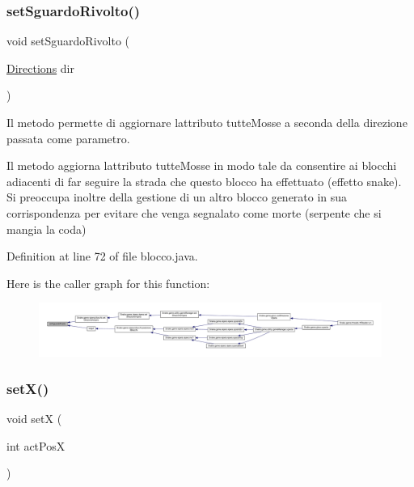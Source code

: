 \subsubsection{\texorpdfstring{set\+Sguardo\+Rivolto()}{setSguardoRivolto()}}
{\footnotesize\ttfamily void set\+Sguardo\+Rivolto (\begin{DoxyParamCaption}\item[{\mbox{\hyperlink{enum_snake_1_1game_1_1utility_1_1_directions}{Directions}}}]{dir }\end{DoxyParamCaption})}



Il metodo permette di aggiornare l\textquotesingle{}attributo tutte\+Mosse a seconda della direzione passata come parametro. 

Il metodo aggiorna l\textquotesingle{}attributo tutte\+Mosse in modo tale da consentire ai blocchi adiacenti di far seguire la strada che questo blocco ha effettuato (effetto snake). Si preoccupa inoltre della gestione di un altro blocco generato in sua corrispondenza per evitare che venga segnalato come morte (serpente che si mangia la coda) 

Definition at line 72 of file blocco.\+java.

Here is the caller graph for this function\+:
\nopagebreak
\begin{figure}[H]
\begin{center}
\leavevmode
\includegraphics[width=350pt]{class_snake_1_1game_1_1vipera_1_1blocco_a2d20c8ebc9efc39ed12392e6486d50d9_icgraph}
\end{center}
\end{figure}
\mbox{\label{class_snake_1_1game_1_1vipera_1_1blocco_ab5a3acb0391238ee37a5da898bffd5f1}} 
\subsubsection{\texorpdfstring{set\+X()}{setX()}}
{\footnotesize\ttfamily void setX (\begin{DoxyParamCaption}\item[{int}]{act\+PosX }\end{DoxyParamCaption})}




